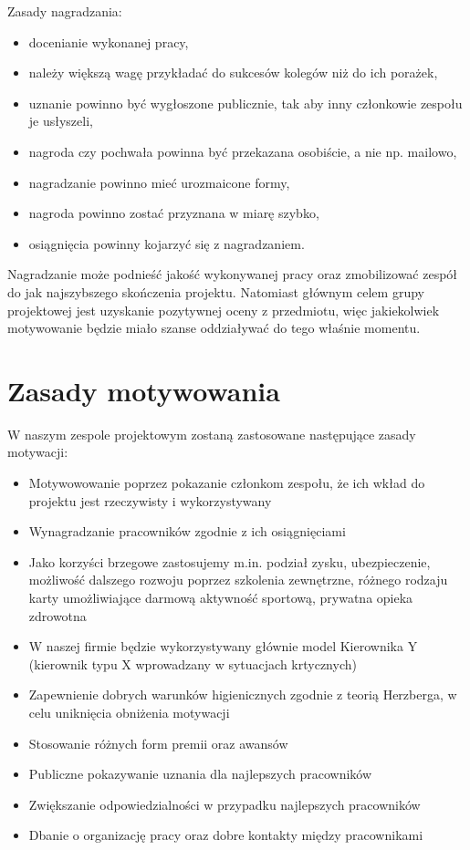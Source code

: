 Zasady nagradzania:

\begin{itemize}
\item docenianie wykonanej pracy,
\item należy większą wagę przykładać do sukcesów kolegów niż do ich porażek,
\item uznanie powinno być wygłoszone publicznie, tak aby inny członkowie zespołu je usłyszeli,
\item nagroda czy pochwała powinna być przekazana osobiście, a nie np. mailowo,
\item nagradzanie powinno mieć urozmaicone formy,
\item nagroda powinno zostać przyznana w miarę szybko,
\item osiągnięcia powinny kojarzyć się z nagradzaniem.
\end{itemize}
Nagradzanie może podnieść jakość wykonywanej pracy oraz zmobilizować zespół do jak najszybszego skończenia projektu. Natomiast głównym celem grupy projektowej jest uzyskanie pozytywnej oceny 
z przedmiotu, więc jakiekolwiek motywowanie będzie miało szanse oddziaływać do tego właśnie momentu.



\section{Zasady motywowania}

W naszym zespole projektowym zostaną zastosowane następujące zasady motywacji:
\begin{itemize}
\item Motywowowanie poprzez pokazanie członkom zespołu, że ich wkład do projektu jest rzeczywisty i wykorzystywany
\item Wynagradzanie pracowników zgodnie z ich osiągnięciami
\item Jako korzyści brzegowe zastosujemy m.in. podział zysku, ubezpieczenie, możliwość dalszego rozwoju poprzez szkolenia zewnętrzne, różnego rodzaju karty umożliwiające darmową aktywność sportową, prywatna opieka zdrowotna
\item W naszej firmie będzie wykorzystywany głównie model Kierownika Y (kierownik typu X wprowadzany w sytuacjach krtycznych)
\item Zapewnienie dobrych warunków higienicznych zgodnie z teorią Herzberga, w celu uniknięcia obniżenia motywacji
\item Stosowanie różnych form premii oraz awansów
\item Publiczne pokazywanie uznania dla najlepszych pracowników
\item Zwiększanie odpowiedzialności w przypadku najlepszych pracowników
\item Dbanie o organizację pracy oraz dobre kontakty między pracownikami
\end{itemize}


